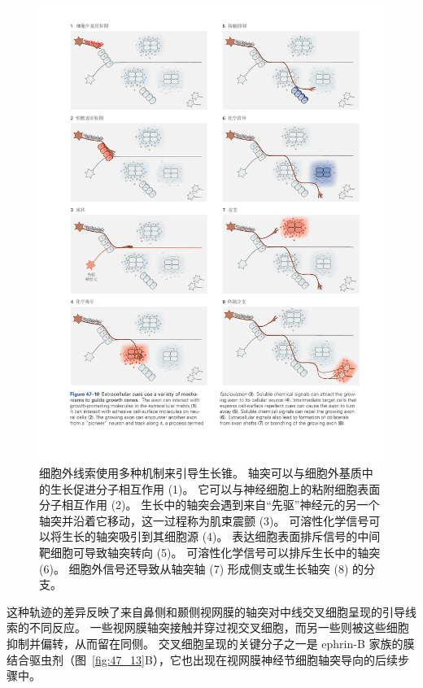 \begin{figure}[htbp]
	\centering
	\includegraphics[width=1.0\linewidth]{chap47/fig_47_10}
	\caption{细胞外线索使用多种机制来引导生长锥。
		轴突可以与细胞外基质中的生长促进分子相互作用 (1)。
		它可以与神经细胞上的粘附细胞表面分子相互作用 (2)。
		生长中的轴突会遇到来自“先驱”神经元的另一个轴突并沿着它移动，这一过程称为肌束震颤 (3)。
		可溶性化学信号可以将生长的轴突吸引到其细胞源 (4)。
		表达细胞表面排斥信号的中间靶细胞可导致轴突转向 (5)。
		可溶性化学信号可以排斥生长中的轴突 (6)。
		细胞外信号还导致从轴突轴 (7) 形成侧支或生长轴突 (8) 的分支。}
	\label{fig:47_10}
\end{figure}


这种轨迹的差异反映了来自鼻侧和颞侧视网膜的轴突对中线交叉细胞呈现的引导线索的不同反应。
一些视网膜轴突接触并穿过视交叉细胞，而另一些则被这些细胞抑制并偏转，从而留在同侧。
交叉细胞呈现的关键分子之一是 ephrin-B 家族的膜结合驱虫剂（图~\ref{fig:47_13}B），它也出现在视网膜神经节细胞轴突导向的后续步骤中。



